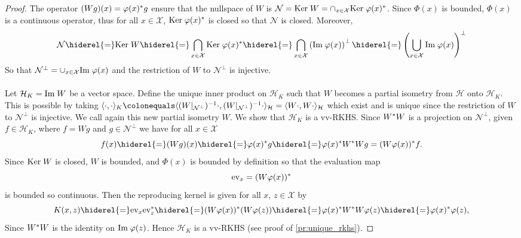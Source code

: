\begin{proof} The operator $(Wg)(x)=\Phi(x)^\adjoint g$ ensure that the nullspace of $W$ is $\mathcal{N}=\Ker W=\cap_{x\in\mathcal{X}}\Ker \Phi(x)^\adjoint$. Since $\Phi(x)$ is bounded, $\Phi(x)$ is a continuous operator, thus for all $x\in\mathcal{X}$, $\Ker \Phi(x)^\adjoint$ is closed so that $\mathcal{N}$ is closed. Moreover,
\begin{dmath*}
\mathcal{N}\hiderel{=}\Ker W\hiderel{=}\bigcap_{x\in\mathcal{X}}\Ker \Phi(x)^\adjoint\hiderel{=}\bigcap_{x\in\mathcal{X}}\left(\Ima \Phi(x)\right)^{\bot}\hiderel{=}\left(\bigcup_{x\in\mathcal{X}}\Ima \Phi(x)\right)^{\bot}
\end{dmath*}
So that $\mathcal{N}^\bot=\cup_{x\in\mathcal{X}}\Ima \Phi(x)$ and the restriction of $W$ to $\mathcal{N}^{\bot}$ is injective. 
\paragraph{}
Let $\mathcal{H}_K=\text{Im}\; W$ be a vector space. Define the unique inner product on $\mathcal{H}_K$ such that $W$ becomes a partial isometry from $\mathcal{H}$ onto $\mathcal{H}_K$. This is possible by taking $\inner{\cdot,\cdot}_K\colonequals\inner{(W|_{\mathcal{N}^{\bot}})^{-1}\cdot, (W|_{\mathcal{N}^{\bot}})^{-1}\cdot}_{\mathcal{H}}=\inner{W\cdot,W\cdot}_{\mathcal{H}}$ 
which exist and is unique since the restriction of $W$ to $\mathcal{N}^{\bot}$ is injective. We call again this new partial isometry $W$. We show that $\mathcal{H}_K$ is a \acl{vv-RKHS}. Since $W^* W$ is a projection on $\mathcal{N}^{\bot}$, given $f\in\mathcal{H}_K$, where $f=Wg$ and $g\in\mathcal{N}^{\bot}$ we have for all $x\in\mathcal{X}$
\begin{dmath*}
f(x)\hiderel{=}(Wg)(x)\hiderel{=}\Phi(x)^\adjoint g\hiderel{=}\Phi(x)^\adjoint W^\adjoint Wg=(W\Phi(x))^\adjoint f.
\end{dmath*}
Since $\text{Ker}\; W$ is closed, $W$ is bounded, and $\Phi(x)$ is bounded by definition so that the evaluation map
\begin{dmath*}
\text{ev}_x=(W\Phi(x))^\adjoint
\end{dmath*}
is bounded so continuous. Then the reproducing kernel is given for all $x$, $z\in\mathcal{X}$ by
\begin{dmath*}
K(x,z)\hiderel{=}\text{ev}_x\text{ev}_z^\adjoint\hiderel{=}(W\Phi(x))^\adjoint(W\Phi(z))\hiderel{=}\Phi(x)^\adjoint W^\adjoint W\Phi(z)\hiderel{=}\Phi(x)^\adjoint\Phi(z),
\end{dmath*}
Since $W^* W$ is the identity on $\Ima \Phi(z)$. Hence $\mathcal{H}_K$ is a \acs{vv-RKHS} (see proof of \cref{pr:unique_rkhs}).
\end{proof}
